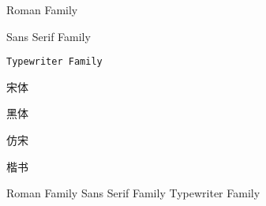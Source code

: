\documentclass{article}
\begin{document}

    \textrm{Roman Family}

    \textsf{Sans Serif Family}

    \texttt{Typewriter Family }

    {\songti 宋体}

    {\heiti 黑体}

    {\fangsong 仿宋}

    {\kaishu 楷书}

    \rmfamily  Roman Family
    \sffamily Sans Serif Family
    \ttfamily Typewriter Family
\end{document}
